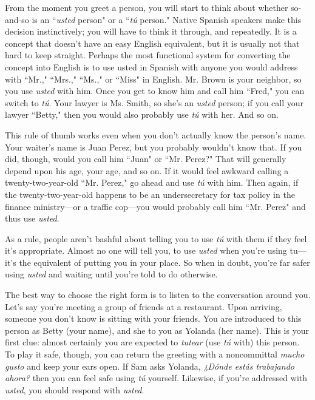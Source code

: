From the moment you greet a person, you will start to think
about whether so-and-so is an ``\emph{usted} person" or a ``\emph{tú} person." Native
Spanish speakers make this decision instinctively; you will have to
think it through, and repeatedly. It is a concept that doesn't have an
easy English equivalent, but it is usually not that hard to keep straight.
Perhaps the most functional system for converting the concept into
English is to use usted in Spanish with anyone you would address with
``Mr.," ``Mrs.," ``Ms.," or ``Miss" in English. Mr. Brown is your neighbor, so you use \emph{usted} with him. Once you get to know him and call
him ``Fred," you can switch to \emph{tú}. Your lawyer is Ms. Smith, so she's
an \emph{usted} person; if you call your lawyer ``Betty," then you would also
probably use \emph{tú} with her. And so on.

This rule of thumb works even when you don't actually know
the person's name. Your waiter's name is Juan Perez, but you probably
wouldn't know that. If you did, though, would you call him ``Juan" or
``Mr. Perez?" That will generally depend upon his age, your age, and so
on. If it would feel awkward calling a twenty-two-year-old ``Mr. Perez,"
go ahead and use \emph{tú} with him. Then again, if the twenty-two-year-old
happens to be an undersecretary for tax policy in the finance ministry---or a traffic cop---you would probably call him ``Mr. Perez" and
thus use \emph{usted}.

As a rule, people aren't bashful about telling you to use \emph{tú}
with them if they feel it's appropriate. Almost no one will tell you, to
use \emph{usted} when you're using tu---it's the equivalent of putting you in
your place. So when in doubt, you're far safer using \emph{usted} and waiting
until you're told to do otherwise.

The best way to choose the right form is to listen to the conversation around you. Let's say you're meeting a group of friends at a
restaurant. Upon arriving, someone you don't know is sitting with
your friends. You are introduced to this person as Betty (your name),
and she to you as Yolanda (her name). This is your first clue: almost
certainly you are expected to \emph{tutear} (use \emph{tú} with) this person. To play
it safe, though, you can return the greeting with a noncommittal \emph{mucho gusto} and keep your ears open. If Sam asks Yolanda, \emph{¿Dónde estás
trabajando ahora?} then you can feel safe using \emph{tú} yourself. Likewise, if
you're addressed with \emph{usted}, you should respond with \emph{usted}.

